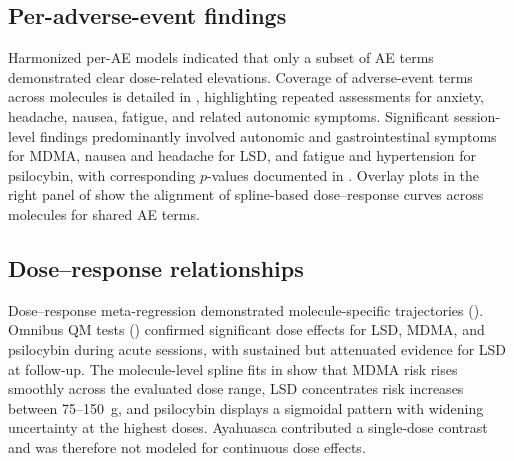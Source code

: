\subsection{Per-adverse-event findings}
Harmonized per-AE models indicated that only a subset of AE terms demonstrated clear dose-related elevations. Coverage of adverse-event terms across molecules is detailed in , highlighting repeated assessments for anxiety, headache, nausea, fatigue, and related autonomic symptoms. Significant session-level findings predominantly involved autonomic and gastrointestinal symptoms for MDMA, nausea and headache for LSD, and fatigue and hypertension for psilocybin, with corresponding $p$-values documented in . Overlay plots in the right panel of  show the alignment of spline-based dose--response curves across molecules for shared AE terms.



\subsection{Dose--response relationships}
Dose--response meta-regression demonstrated molecule-specific trajectories (). Omnibus QM tests () confirmed significant dose effects for LSD, MDMA, and psilocybin during acute sessions, with sustained but attenuated evidence for LSD at follow-up. The molecule-level spline fits in  show that MDMA risk rises smoothly across the evaluated dose range, LSD concentrates risk increases between 75--150~\textmu g, and psilocybin displays a sigmoidal pattern with widening uncertainty at the highest doses. Ayahuasca contributed a single-dose contrast and was therefore not modeled for continuous dose effects.

